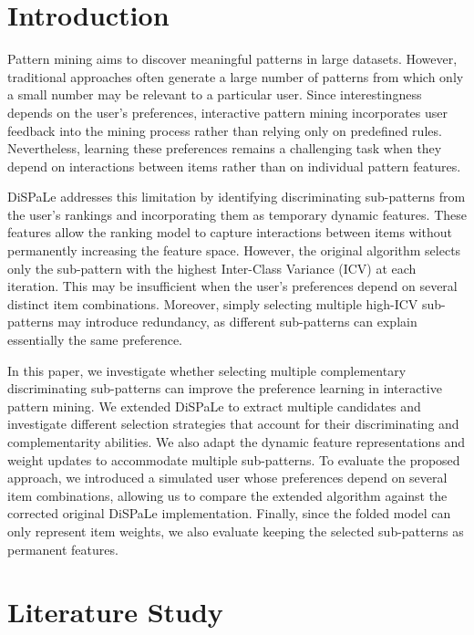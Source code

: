 \documentclass[sigconf]{acmart}
\begin{document}
\section{Introduction}
Pattern mining aims to discover meaningful patterns in large datasets. However, traditional approaches often generate a large number of patterns from which only a small number may be relevant to a particular user. Since interestingness depends on the user's preferences, interactive pattern mining incorporates user feedback into the mining process rather than relying only on predefined rules. Nevertheless, learning these preferences remains a challenging task when they depend on interactions between items rather than on individual pattern features. 

DiSPaLe addresses this limitation by identifying discriminating sub-patterns from the user's rankings and incorporating them as temporary dynamic features. These features allow the ranking model to capture interactions between items without permanently increasing the feature space. However, the original algorithm selects only the sub-pattern with the highest Inter-Class Variance (ICV) at each iteration. This may be insufficient when the user's preferences depend on several distinct item combinations. Moreover, simply selecting multiple high-ICV sub-patterns may introduce redundancy, as different sub-patterns can explain essentially the same preference. 

In this paper, we investigate whether selecting multiple complementary discriminating sub-patterns can improve the preference learning in interactive pattern mining. We extended DiSPaLe to extract multiple candidates and investigate different selection strategies that account for their discriminating and complementarity abilities. We also adapt the dynamic feature representations and weight updates to accommodate multiple sub-patterns. To evaluate the proposed approach, we introduced a simulated user whose preferences depend on several item combinations, allowing us to compare the extended algorithm against the corrected original DiSPaLe implementation. Finally, since the folded model can only represent item weights, we also evaluate keeping the selected sub-patterns as permanent features.


\section{Literature Study}
\label{sec:literature}
\end{document}
